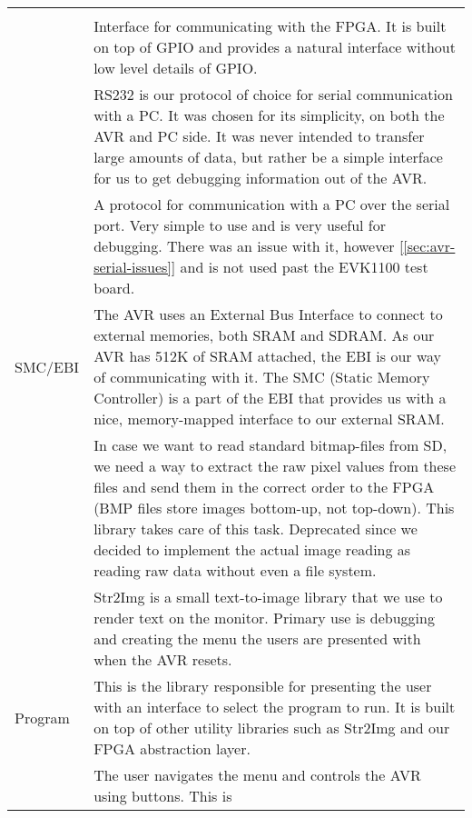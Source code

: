\begin{table}[htbp]
\begin{tabular}{l|p{10cm}}
\begin{comment}
	GPIO, and provide a more natural interface for us to use. \\
\end{comment}
	FPGA/GPIO & Interface for communicating with the FPGA. It is built on top of GPIO
	and provides a natural interface without low level details of GPIO. \\
	\hline
\begin{comment}
	RS232 & RS232 is our protocol of choice for serial communication with a PC. It
	was chosen for its simplicity, on both the AVR and PC side. It was never
	intended to transfer large amounts of data, but rather be a simple
	interface for us to get debugging information out of the AVR. \\
\end{comment}
	RS232 & A protocol for communication with a PC over the serial port. Very simple to
	use and is very useful for debugging. There was an issue with it, however [\ref{sec:avr-serial-issues}]
	and is not used past the EVK1100 test board. \\
	\hline
	SMC/EBI & The AVR uses an External Bus Interface to connect to external memories,
	both SRAM and SDRAM. As our AVR has 512K of SRAM attached, the EBI is
	our way of communicating with it.
	The SMC (Static Memory Controller) is a part of the EBI that provides us
	with a nice, memory-mapped interface to our external SRAM. \\
	\hline
\begin{comment}
	BMP & In case we want to read standard bitmap-files from SD, we need a way to
	extract the raw pixel values from these files and send them in the
	correct order to the FPGA (BMP files store images bottom-up, not
	top-down). This library takes care of this task. Deprecated since we
	decided to implement the actual image reading as reading raw data without
	even a file system. \\
	\hline
\end{comment}
	Str2Img & Str2Img is a small text-to-image library that we use to render text on
	the monitor. Primary use is debugging and creating the menu the users are presented
	with when the AVR resets. \\
	\hline
	Program & This is the library responsible for presenting the user with an
	interface to select the program to run. It is built on top of other
	utility libraries such as Str2Img and our FPGA abstraction layer. \\
	\hline
\begin{comment}
	\hline
	Button & The user navigates the menu and controls the AVR using buttons. This is

\end{comment}
\end{tabular}
\end{table}
